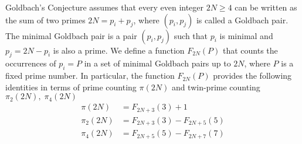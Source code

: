 Goldbach's Conjecture assumes that every even integer $2N \geq 4$ can be written as the sum of two primes
$2N = p_i + p_j$, where $(p_i, p_j)$ is called a Goldbach pair.
The minimal Goldbach pair is a pair $(p_i, p_j)$ such that $p_i$ is minimal and $p_j = 2N - p_i$ is also a prime.
We define a function $F_{2N}(P)$ that counts the occurrences of $p_i = P$ in a set of minimal Goldbach pairs
up to $2N$, where $P$ is a fixed prime number.
In particular, the function $F_{2N}(P)$ provides the following identities in terms of prime counting $\pi(2N)$ and
twin-prime counting $\pi_2(2N), \; \pi_4(2N)$
\begin{align*}
    \pi(2N)   &= F_{2N+3}(3) + 1 \\
    \pi_2(2N) &= F_{2N+3}(3) - F_{2N+5}(5) \\
    \pi_4(2N) &= F_{2N+5}(5) - F_{2N+7}(7)
\end{align*}
